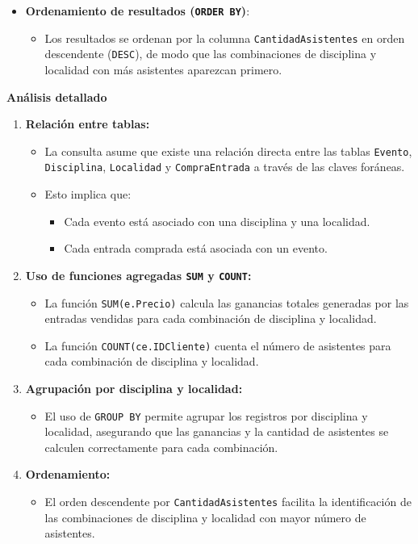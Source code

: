 \begin{itemize}
   \item \textbf{Ordenamiento de resultados (\texttt{ORDER BY})}:
   \begin{itemize}
       \item Los resultados se ordenan por la columna \texttt{CantidadAsistentes} en orden descendente (\texttt{DESC}), de modo que las combinaciones de disciplina y localidad con más asistentes aparezcan primero.
   \end{itemize}
\end{itemize}

\textbf{Análisis detallado}

\begin{enumerate}
   \item \textbf{Relación entre tablas:}
   \begin{itemize}
       \item La consulta asume que existe una relación directa entre las tablas \texttt{Evento}, \texttt{Disciplina}, \texttt{Localidad} y \texttt{CompraEntrada} a través de las claves foráneas.
       \item Esto implica que:
       \begin{itemize}
           \item Cada evento está asociado con una disciplina y una localidad.
           \item Cada entrada comprada está asociada con un evento.
       \end{itemize}
   \end{itemize}
   
   \item \textbf{Uso de funciones agregadas \texttt{SUM} y \texttt{COUNT}:}
   \begin{itemize}
       \item La función \texttt{SUM(e.Precio)} calcula las ganancias totales generadas por las entradas vendidas para cada combinación de disciplina y localidad.
       \item La función \texttt{COUNT(ce.IDCliente)} cuenta el número de asistentes para cada combinación de disciplina y localidad.
   \end{itemize}
   
   \item \textbf{Agrupación por disciplina y localidad:}
   \begin{itemize}
       \item El uso de \texttt{GROUP BY} permite agrupar los registros por disciplina y localidad, asegurando que las ganancias y la cantidad de asistentes se calculen correctamente para cada combinación.
   \end{itemize}
   
   \item \textbf{Ordenamiento:}
   \begin{itemize}
       \item El orden descendente por \texttt{CantidadAsistentes} facilita la identificación de las combinaciones de disciplina y localidad con mayor número de asistentes.
   \end{itemize}
\end{enumerate}

